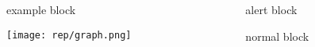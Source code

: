 \documentclass{beamer}
\begin{document}
                
        \begin{frame}
        \frametitle{}
        \framesubtitle{}

                \begin{columns}[c] %
                
                        \begin{column}{5.5cm} %
                                \begin{exampleblock}{example block}
                                \end{exampleblock}
                                \texttt{[image: rep/graph.png]}
                        \end{column}
                        
                        \begin{column}{5.5cm} %
                                \begin{alertblock}{alert block}
                                \end{alertblock}
                                \vspace{1cm} %
                                \begin{block}{normal block}
                                \end{block}
                        \end{column}

                \end{columns}

        \end{frame}
\end{document}
